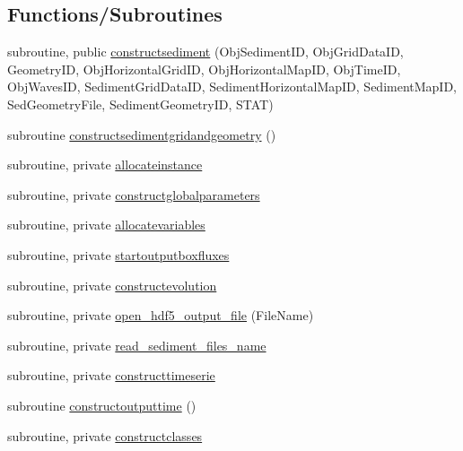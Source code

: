 \subsection*{Functions/\+Subroutines}
\begin{DoxyCompactItemize}
\item 
subroutine, public \mbox{\hyperlink{namespacemodulesediment_a1a3b01f7483f6fefc6f2dac6a51d664c}{constructsediment}} (Obj\+Sediment\+ID, Obj\+Grid\+Data\+ID, Geometry\+ID, Obj\+Horizontal\+Grid\+ID, Obj\+Horizontal\+Map\+ID, Obj\+Time\+ID, Obj\+Waves\+ID, Sediment\+Grid\+Data\+ID, Sediment\+Horizontal\+Map\+ID, Sediment\+Map\+ID, Sed\+Geometry\+File, Sediment\+Geometry\+ID, S\+T\+AT)
\item 
subroutine \mbox{\hyperlink{namespacemodulesediment_a4fcfee70467ab31177134369a945bf94}{constructsedimentgridandgeometry}} ()
\item 
subroutine, private \mbox{\hyperlink{namespacemodulesediment_a7cf40ca051d012f054efecd59d7ffb97}{allocateinstance}}
\item 
subroutine, private \mbox{\hyperlink{namespacemodulesediment_a58c9978541dc90a336fa76f940b8061b}{constructglobalparameters}}
\item 
subroutine, private \mbox{\hyperlink{namespacemodulesediment_a7feb9a14efb0c8cc97dfc870ff9804ce}{allocatevariables}}
\item 
subroutine, private \mbox{\hyperlink{namespacemodulesediment_ac07e155e923f9f500063126c9e4f7ede}{startoutputboxfluxes}}
\item 
subroutine, private \mbox{\hyperlink{namespacemodulesediment_a65ecb7c9b87860dde4303791884a9956}{constructevolution}}
\item 
subroutine, private \mbox{\hyperlink{namespacemodulesediment_afe850b14e10e8db70a1bd5879fc5c2ea}{open\+\_\+hdf5\+\_\+output\+\_\+file}} (File\+Name)
\item 
subroutine, private \mbox{\hyperlink{namespacemodulesediment_ae14a9f4cd6513444502e3774b27d6f2e}{read\+\_\+sediment\+\_\+files\+\_\+name}}
\item 
subroutine, private \mbox{\hyperlink{namespacemodulesediment_aafc201d260f566a644259cfca436de86}{constructtimeserie}}
\item 
subroutine \mbox{\hyperlink{namespacemodulesediment_aacb4e3dc70adfbda3e0d8000b2088b3d}{constructoutputtime}} ()
\item 
subroutine, private \mbox{\hyperlink{namespacemodulesediment_aab617a4a3f8db9a8c86241473054067d}{constructclasses}}
\item 

\end{DoxyCompactItemize}
